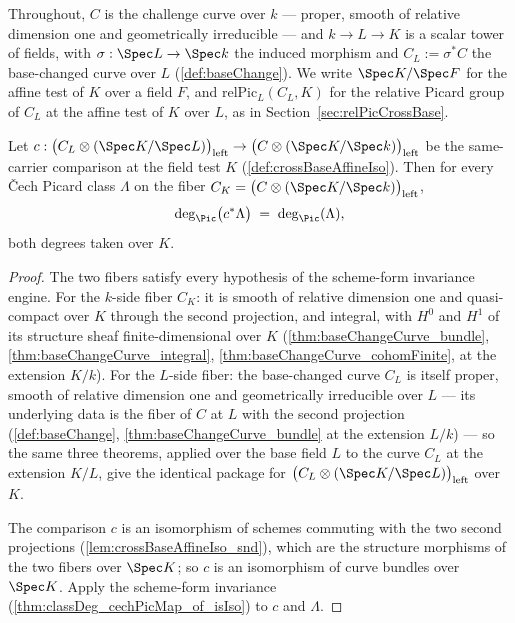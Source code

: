 Throughout, \(C\) is the challenge curve over \(k\) --- proper, smooth of relative
dimension one and geometrically irreducible --- and \(k \to L \to K\) is a scalar
tower of fields, with \(\sigma : \Spec L \to \Spec k\) the induced morphism and
\(C_L := \sigma^{*}C\) the base-changed curve over \(L\) (\ref{def:baseChange}). We
write \(\Spec K/\Spec F\) for the affine test of \(K\) over a field \(F\), and
\(\mathrm{relPic}_L(C_L, K)\) for the relative Picard group of \(C_L\) at the affine
test of \(K\) over \(L\), as in Section~\ref{sec:relPicCrossBase}.

\begin{theorem}
  \label{thm:classDeg_cechPicMap_crossBaseAffineIso}
  \leanok
  Let \(c : \bigl(C_L \otimes (\Spec K/\Spec L)\bigr)_{\mathrm{left}} \to
  \bigl(C \otimes (\Spec K/\Spec k)\bigr)_{\mathrm{left}}\) be the same-carrier
  comparison at the field test \(K\) (\ref{def:crossBaseAffineIso}). Then for every
  \v Cech Picard class \(\Lambda\) on the fiber
  \(C_K = \bigl(C \otimes (\Spec K/\Spec k)\bigr)_{\mathrm{left}}\),
  \[
    \deg_{\Pic}\bigl(c^{*}\Lambda\bigr) \;=\; \deg_{\Pic}(\Lambda),
  \]
  both degrees taken over \(K\).
\end{theorem}
\begin{proof}
  \leanok
  The two fibers satisfy every hypothesis of the scheme-form invariance engine. For
  the \(k\)-side fiber \(C_K\): it is smooth of relative dimension one and
  quasi-compact over \(K\) through the second projection, and integral, with \(H^0\)
  and \(H^1\) of its structure sheaf finite-dimensional over \(K\)
  (\ref{thm:baseChangeCurve_bundle}, \ref{thm:baseChangeCurve_integral},
  \ref{thm:baseChangeCurve_cohomFinite}, at the extension \(K/k\)). For the
  \(L\)-side fiber: the base-changed curve \(C_L\) is itself proper, smooth of
  relative dimension one and geometrically irreducible over \(L\) --- its underlying
  data is the fiber of \(C\) at \(L\) with the second projection
  (\ref{def:baseChange}, \ref{thm:baseChangeCurve_bundle} at the extension
  \(L/k\)) --- so the same three theorems, applied over the base field \(L\) to the
  curve \(C_L\) at the extension \(K/L\), give the identical package for
  \(\bigl(C_L \otimes (\Spec K/\Spec L)\bigr)_{\mathrm{left}}\) over \(K\).

  The comparison \(c\) is an isomorphism of schemes commuting with the two second
  projections (\ref{lem:crossBaseAffineIso_snd}), which are the structure morphisms
  of the two fibers over \(\Spec K\); so \(c\) is an isomorphism of curve bundles
  over \(\Spec K\). Apply the scheme-form invariance
  (\ref{thm:classDeg_cechPicMap_of_isIso}) to \(c\) and \(\Lambda\).
\end{proof}

